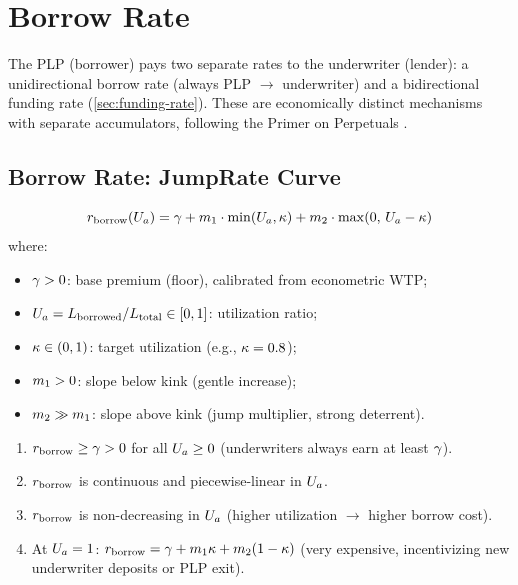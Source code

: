 
\section{Borrow Rate}\label{sec:borrow-rate}

The PLP (borrower) pays two separate rates to the underwriter (lender):
a unidirectional borrow rate (always PLP $\to$ underwriter) and a bidirectional
funding rate (\cref{sec:funding-rate}). These are economically distinct mechanisms
with separate accumulators, following the Primer on Perpetuals
\cite{angeris2022perpetuals}.

\subsection{Borrow Rate: JumpRate Curve}

\begin{definition}\label{def:borrow-rate}
\begin{equation}\label{eq:borrow-rate}
  r_{\text{borrow}}(U_a) = \gamma + m_1 \cdot \min(U_a, \kappa)
                 + m_2 \cdot \max(0,\, U_a - \kappa)
\end{equation}
where:
\begin{itemize}
  \item $\gamma > 0$: base premium (floor), calibrated from econometric WTP;
  \item $U_a = L_{\text{borrowed}} / L_{\text{total}} \in [0, 1]$: utilization ratio;
  \item $\kappa \in (0, 1)$: target utilization (e.g., $\kappa = 0.8$);
  \item $m_1 > 0$: slope below kink (gentle increase);
  \item $m_2 \gg m_1$: slope above kink (jump multiplier, strong deterrent).
\end{itemize}
\end{definition}

\begin{proposition}\label{prop:borrow-properties}
\begin{enumerate}[label=(\roman*)]
  \item $r_{\text{borrow}} \geq \gamma > 0$ for all $U_a \geq 0$ (underwriters always earn at least $\gamma$).
  \item $r_{\text{borrow}}$ is continuous and piecewise-linear in $U_a$.
  \item $r_{\text{borrow}}$ is non-decreasing in $U_a$ (higher utilization $\to$ higher borrow cost).
  \item At $U_a = 1$: $r_{\text{borrow}} = \gamma + m_1 \kappa + m_2(1 - \kappa)$
    (very expensive, incentivizing new underwriter deposits or PLP exit).
\end{enumerate}
\end{proposition}

